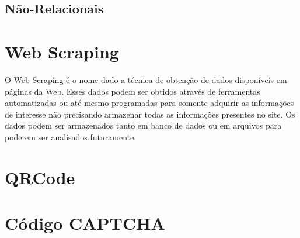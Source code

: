 \subsection{Não-Relacionais}

\section{Web Scraping}

O Web Scraping é o nome dado a técnica de obtenção de dados disponíveis em páginas da Web. Esses dados podem ser obtidos através de ferramentas automatizadas ou até mesmo programadas para somente adquirir as informações de interesse não precisando armazenar todas as informações presentes no site.
Os dados podem ser armazenados tanto em banco de dados ou em arquivos para poderem ser analisados futuramente.


\section{QRCode}

\section{Código CAPTCHA}